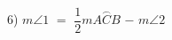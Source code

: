 \documentclass[preview]{standalone}
\begin{document}
\begin{center}
6) $m\angle{1}$ $=$ $\dfrac{1}{2}$$m\overset{\frown}{ACB}$ $-$ $m\angle{2}$
\end{center}
\end{document}
